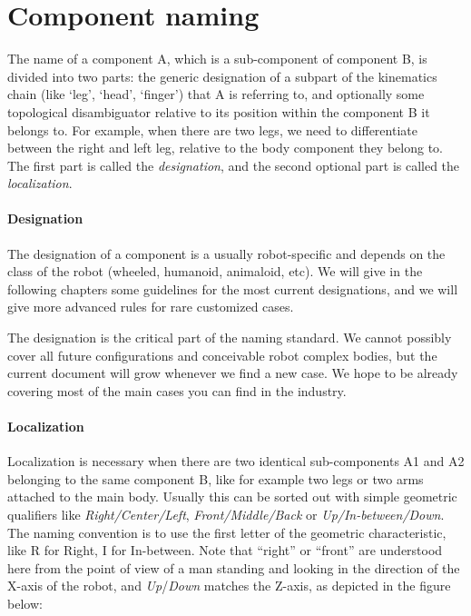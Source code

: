 \documentclass[a4paper]{article}
\begin{document}
\section[Component naming]{Component naming}
{
\textsf{The name of a component A, which is a sub-component of component
B, is divided into two parts: the generic designation of a subpart of
the kinematics chain (like ‘leg’, ‘head’, ‘finger’) that A is referring
to, and optionally some topological disambiguator relative to its
position within the component B it belongs to. For example, when there
are two legs, we need to differentiate between the right and left leg,
relative to the body component they belong to. The first part is called
the }\textsf{\textit{designation}}\textsf{, and the second optional
part is called the }\textsf{\textit{localization}}\textsf{.}}

\paragraph{Designation}


The designation of a component is a usually robot-specific and depends
on the class of the robot (wheeled, humanoid, animaloid, etc). We will
give in the following chapters some guidelines for the most current
designations, and we will give more advanced rules for rare customized
cases.


The designation is the critical part of the naming standard. We cannot
possibly cover all future configurations and conceivable robot complex
bodies, but the current document will grow whenever we find a new case.
We hope to be already covering most of the main cases you can find in
the industry.

\paragraph{Localization }

{
\textsf{Localization is necessary when there are two identical
sub-components A1 and A2 belonging to the same component B, like for
example two legs or two arms attached to the main body. Usually this
can be sorted out with simple geometric qualifiers like
}\textsf{\textit{Right/Center/Left}}\textsf{,
}\textsf{\textit{Front/Middle/Back}}\textsf{ or
}\textsf{\textit{Up}}\textsf{\textit{/In-between/Down}}\textsf{. The
naming convention is to use the first letter of the geometric
characteristic, like }R\textsf{ for Right, }I\textsf{ for In-between.
Note that “right” or “front” are understood here from the point of view
of a man standing and looking in the direction of the X-axis of the
robot, and
}\textsf{\textit{Up}}\textsf{/}\textsf{\textit{Down}}\textsf{ matches
the Z-axis, as depicted in the figure below:}}
\end{document}
